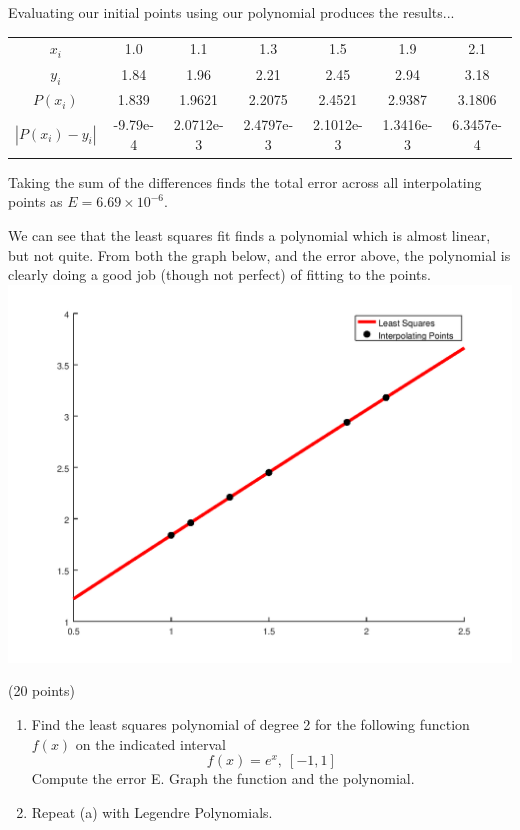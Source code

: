 \documentclass[10pt]{jhwhw}
\begin{document}
	Evaluating our initial points using our polynomial produces the results...
	\bigbreak
	\begin{tabular}{ccccccc}
		\hline
		$x_i$ & 1.0 & 1.1 & 1.3 & 1.5 & 1.9 & 2.1 \\
		$y_i$ & 1.84 & 1.96 & 2.21 & 2.45 & 2.94 & 3.18 \\
		$P(x_i)$ & 1.839 & 1.9621 & 2.2075 & 2.4521 & 2.9387 & 3.1806 \\
		$|P(x_i)-y_i|$ & -9.79e-4 & 2.0712e-3 & 2.4797e-3 & 2.1012e-3 & 1.3416e-3 & 6.3457e-4 \\
		\hline
	\end{tabular} \bigbreak
	Taking the sum of the differences finds the total error across all interpolating
	points as $E = 6.69\times 10^{-6}$.

	\bigbreak
	We can see that the least squares fit finds a polynomial which is 
	almost linear, but not quite. From both the graph below, and the error above,
	the polynomial is clearly doing a good job (though not perfect) of fitting to
	the points.
	\includegraphics[scale=0.75]{p1}

\problem{} (20 points)

	\begin{enumerate}
		\item Find the least squares polynomial of degree 2 for the following function
			$f(x)$ on the indicated interval
			$$
				f(x) = e^x,\ [-1,1]
			$$
			Compute the error E. Graph the function and the polynomial.
		\item Repeat (a) with Legendre Polynomials.
	\end{enumerate}
\end{document}
